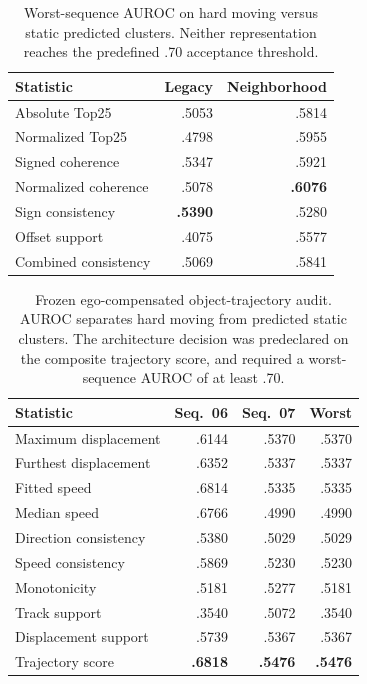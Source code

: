 \begin{table}[t]
\centering
\caption{Worst-sequence AUROC on hard moving versus static predicted clusters.
Neither representation reaches the predefined .70 acceptance threshold.}
\label{tab:residual_audit}
\small
\begin{tabular}{lrr}
\toprule
Statistic & Legacy & Neighborhood \\
\midrule
Absolute Top25       & .5053 & .5814 \\
Normalized Top25     & .4798 & .5955 \\
Signed coherence     & .5347 & .5921 \\
Normalized coherence & .5078 & \textbf{.6076} \\
Sign consistency     & \textbf{.5390} & .5280 \\
Offset support       & .4075 & .5577 \\
Combined consistency & .5069 & .5841 \\
\bottomrule
\end{tabular}
\end{table}

\begin{table}[t]
\centering
\caption{Frozen ego-compensated object-trajectory audit. AUROC separates hard
moving from predicted static clusters. The architecture decision was
predeclared on the composite trajectory score, and required a worst-sequence
AUROC of at least .70.}
\label{tab:trajectory_audit}
\small
\begin{tabular}{lrrr}
\toprule
Statistic & Seq.~06 & Seq.~07 & Worst \\
\midrule
Maximum displacement   & .6144 & .5370 & .5370 \\
Furthest displacement  & .6352 & .5337 & .5337 \\
Fitted speed            & .6814 & .5335 & .5335 \\
Median speed            & .6766 & .4990 & .4990 \\
Direction consistency   & .5380 & .5029 & .5029 \\
Speed consistency       & .5869 & .5230 & .5230 \\
Monotonicity            & .5181 & .5277 & .5181 \\
Track support           & .3540 & .5072 & .3540 \\
Displacement support    & .5739 & .5367 & .5367 \\
Trajectory score        & \textbf{.6818} & \textbf{.5476} & \textbf{.5476} \\
\bottomrule
\end{tabular}
\end{table}
